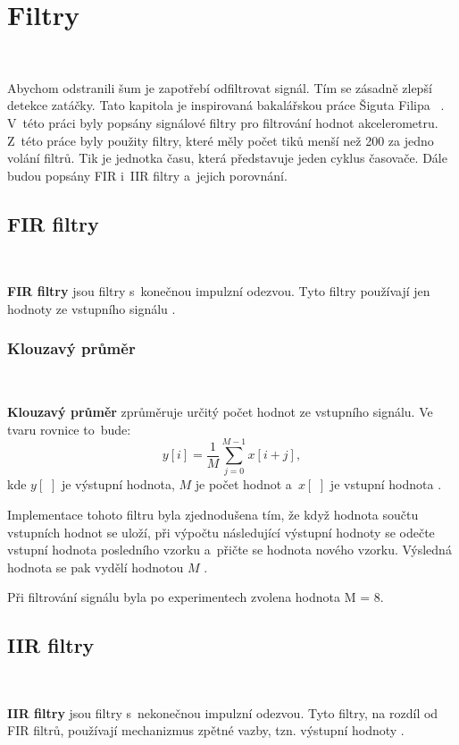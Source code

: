 \chapter{Filtry}
\label{sec:Filters}\

Abychom odstranili šum je zapotřebí odfiltrovat signál. Tím se zásadně zlepší
detekce zatáčky. Tato kapitola je inspirovaná bakalářskou práce Šiguta Filipa
~\cite{krokomer}. V~této práci byly popsány 
signálové filtry pro filtrování hodnot akcelerometru. Z~této práce byly použity 
filtry, které měly počet tiků menší než 200 za jedno volání filtrů. Tik je jednotka 
času, která představuje jeden cyklus časovače. Dále budou popsány FIR i~IIR filtry 
a~jejich porovnání.

\section{FIR filtry}\

\textbf{FIR filtry} jsou filtry s~konečnou impulzní odezvou. Tyto filtry používají
jen hodnoty ze vstupního signálu \cite{FIR}.

\subsection{Klouzavý průměr}\

\textbf{Klouzavý průměr} zprůměruje určitý počet hodnot ze vstupního signálu. Ve
tvaru rovnice to~bude:
\begin{equation}
y[i] = \frac{1}{M}\sum_{j = 0}^{M - 1}x[i+j],
\end{equation}
kde $y[\,\,]$ je výstupní hodnota, $M$ je počet hodnot a~$x[\,\,]$ je vstupní
hodnota \cite{Filters}.

Implementace tohoto filtru byla zjednodušena tím, že když hodnota součtu vstupních
hodnot se uloží, při výpočtu následující výstupní hodnoty se odečte vstupní hodnota
posledního vzorku a~přičte se hodnota nového vzorku. Výsledná hodnota se pak vydělí
hodnotou $M$ \cite{krokomer}.

Při filtrování signálu byla po experimentech zvolena hodnota M = 8.

\section{IIR filtry}\

\textbf{IIR filtry} jsou filtry s~nekonečnou impulzní odezvou. Tyto filtry, 
na rozdíl od FIR filtrů, používají mechanizmus zpětné vazby, tzn. výstupní
hodnoty \cite{IIR}.


